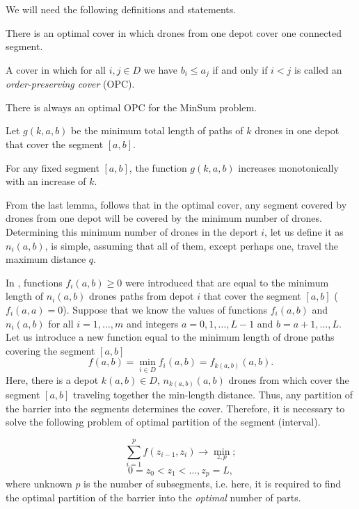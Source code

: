 \documentclass[runningheads]{llncs}
\begin{document}
We will need the following definitions and statements.

\begin{lemma}\cite{ErShad24}
 There is an optimal cover in which drones from one depot cover one connected segment.
\end{lemma}

\begin{definition}\cite{ErShad24}
 A cover in which for all $i,j\in D$ we have $b_i\leq a_j$ if and only if $i<j$ is called an \emph{order-preserving cover} (OPC).
\end{definition}

\begin{lemma}\cite{ErShad24}
 There is always an optimal OPC for the MinSum problem.
\end{lemma}

Let $g(k,a,b)$ be the minimum total length of paths of $k$ drones in one depot that cover the segment $[a,b]$.

\begin{lemma}\cite{ErShad24}
 For any fixed segment $[a,b]$, the function $g(k,a,b)$ increases monotonically with an increase of $k$.
\end{lemma}

From the last lemma, follows that in the optimal cover, any segment covered by drones from one depot will be covered by the minimum number of drones. Determining this minimum number of drones in the deport $i$, let us define it as $n_i(a,b)$, is simple, assuming that all of them, except perhaps one, travel the maximum distance $q$.

In \cite{ErShad24}, functions $f_i(a,b)\geq 0$ were introduced that are equal to the minimum length of $n_i(a,b)$ drones paths from depot $i$ that cover the segment $[a,b]$ ($f_i(a,a)=0$). Suppose that we know the values of functions $f_i(a,b)$ and $n_i(a,b)$ for all $i=1,\ldots,m$ and integers $a=0,1,\ldots,L-1$ and $b=a+1,\ldots,L$. Let us introduce a new function equal to the minimum length of drone paths covering the segment $[a,b]$
$$
 f(a,b)=\min\limits_{i\in D} f_i(a,b)=f_{k(a,b)}(a,b).
$$
Here, there is a depot $k(a,b)\in D$, $n_{k(a,b)}(a,b)$ drones from which cover the segment $[a,b]$ traveling together the min-length distance. Thus, any partition of the barrier into the segments determines the cover. Therefore, it is necessary to solve the following problem of optimal partition of the segment (interval).

\begin{equation}\label{e1}
  \sum_{i=1}^{p} f(z_{i-1},z_i)\rightarrow\min\limits_{z,p};
\end{equation}
\begin{equation}\label{e2}
  0=z_0<z_1<\ldots,z_p=L,
\end{equation}
where unknown $p$ is the number of subsegments, i.e. here, it is required to find the optimal partition of the barrier into the \emph{optimal} number of parts.
\end{document}
